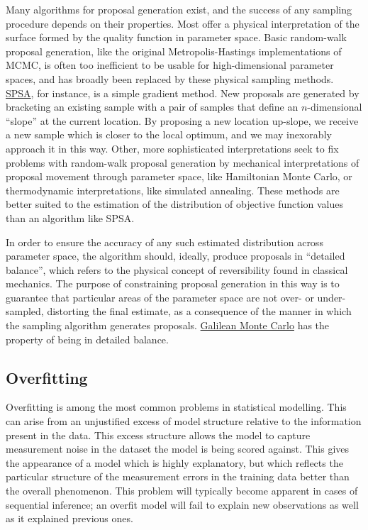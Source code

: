 Many algorithms for proposal generation exist, and the success of any sampling procedure depends on their properties. Most offer a physical interpretation of the surface formed by the quality function in parameter space. Basic random-walk proposal generation, like the original Metropolis-Hastings implementations of MCMC, is often too inefficient to be usable for high-dimensional parameter spaces, and has broadly been replaced by these physical sampling methods. \hyperref[SPSA]{SPSA}, for instance, is a simple gradient method. New proposals are generated by bracketing an existing sample with a pair of samples that define an $n$-dimensional ``slope'' at the current location. By proposing a new location up-slope, we receive a new sample which is closer to the local optimum, and we may inexorably approach it in this way. Other, more sophisticated interpretations seek to fix problems with random-walk proposal generation by mechanical interpretations of proposal movement through parameter space, like Hamiltonian Monte Carlo, or thermodynamic interpretations, like simulated annealing. These methods are better suited to the estimation of the distribution of objective function values than an algorithm like SPSA.

In order to ensure the accuracy of any such estimated distribution across parameter space, the algorithm should, ideally, produce proposals in ``detailed balance'', which refers to the physical concept of reversibility found in classical mechanics. The purpose of constraining proposal generation in this way is to guarantee that particular areas of the parameter space are not over- or under-sampled, distorting the final estimate, as a consequence of the manner in which the sampling algorithm generates proposals. \hyperref[GMC]{Galilean Monte Carlo} has the property of being in detailed balance.

\subsection{Overfitting}
\label{ssec:overfit}
Overfitting is among the most common problems in statistical modelling. This can arise from an unjustified excess of model structure relative to the information present in the data. This excess structure allows the model to capture measurement noise in the dataset the model is being scored against. This gives the appearance of a model which is highly explanatory, but which reflects the particular structure of the measurement errors in the training data better than the overall phenomenon. This problem will typically become apparent in cases of sequential inference; an overfit model will fail to explain new observations as well as it explained previous ones.

